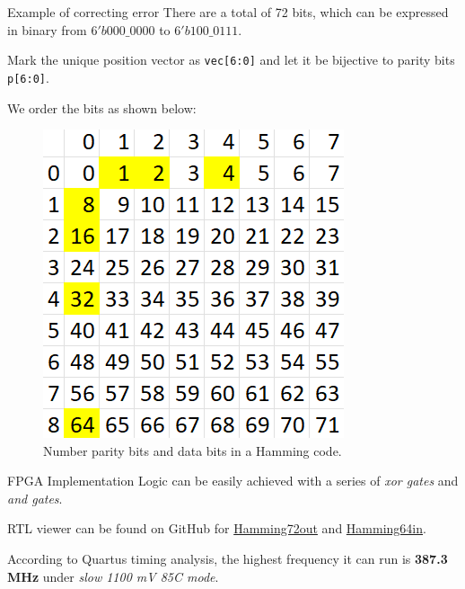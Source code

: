 \documentclass{beamer}
\begin{document}
\begin{frame}{Example of correcting error}
    There are a total of 72 bits, which can be expressed in binary from $6'b000\_0000$ to $6'b 100\_0111$.

    Mark the unique position vector as \texttt{vec[6:0]} and let it be bijective to
    parity bits \texttt{p[6:0]}.

    We order the bits as shown below:

    \begin{figure}[htbp]
        \centerline{\includegraphics[scale = 0.6]{Images/Hamming_bits_order.png}}
        \caption{Number parity bits and data bits in a Hamming code.}
    \end{figure}
\end{frame}

\begin{frame}{FPGA Implementation}
    Logic can be easily achieved with a series of \textit{xor gates} and \textit{and gates}.

    RTL viewer can be found on GitHub for \href{https://github.com/luckunately/ELEC433-Projects/blob/add-tex/Hamming72out/Hamming72out_RTL.pdf}{Hamming72out} and \href{https://github.com/luckunately/ELEC433-Projects/blob/add-tex/Hamming64in/Hamming64inRTL.pdf}{Hamming64in}.

    According to Quartus timing analysis, the highest frequency it can run is
    \textbf{387.3 MHz} under \textit{slow 1100 mV 85C mode}.
\end{frame}
\end{document}
